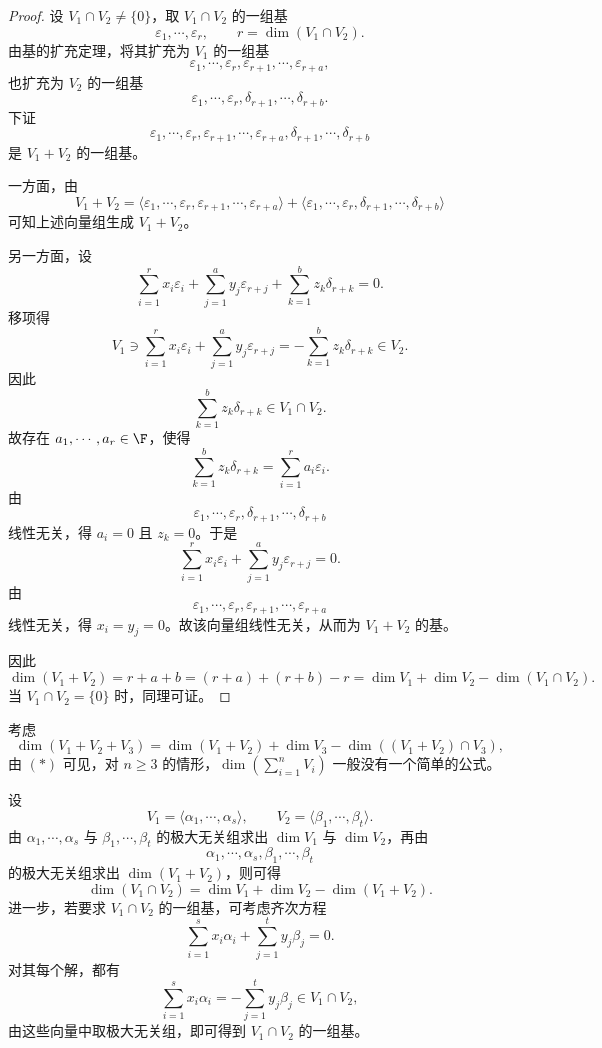 \begin{proof}
	设 $V_1\cap V_2\neq\{0\}$，取 $V_1\cap V_2$ 的一组基
	\[
	\varepsilon_1,\cdots,\varepsilon_r,
	\qquad
	r=\dim(V_1\cap V_2).
	\]
	由基的扩充定理，将其扩充为 $V_1$ 的一组基
	\[
	\varepsilon_1,\cdots,\varepsilon_r,
	\varepsilon_{r+1},\cdots,\varepsilon_{r+a},
	\]
	也扩充为 $V_2$ 的一组基
	\[
	\varepsilon_1,\cdots,\varepsilon_r,
	\delta_{r+1},\cdots,\delta_{r+b}.
	\]
	下证
	\[
	\varepsilon_1,\cdots,\varepsilon_r,
	\varepsilon_{r+1},\cdots,\varepsilon_{r+a},
	\delta_{r+1},\cdots,\delta_{r+b}
	\]
	是 $V_1+V_2$ 的一组基。
	
	一方面，由
	\[
	V_1+V_2
	=
	\langle \varepsilon_1,\cdots,\varepsilon_r,
	\varepsilon_{r+1},\cdots,\varepsilon_{r+a}\rangle
	+
	\langle \varepsilon_1,\cdots,\varepsilon_r,
	\delta_{r+1},\cdots,\delta_{r+b}\rangle
	\]
	可知上述向量组生成 $V_1+V_2$。
	
	另一方面，设
	\[
	\sum_{i=1}^{r}x_i\varepsilon_i
	+
	\sum_{j=1}^{a}y_j\varepsilon_{r+j}
	+
	\sum_{k=1}^{b}z_k\delta_{r+k}
	=0.
	\]
	移项得
	\[
	V_1\ni
	\sum_{i=1}^{r}x_i\varepsilon_i
	+
	\sum_{j=1}^{a}y_j\varepsilon_{r+j}
	=
	-\sum_{k=1}^{b}z_k\delta_{r+k}
	\in V_2.
	\]
	因此
	\[
	\sum_{k=1}^{b}z_k\delta_{r+k}\in V_1\cap V_2.
	\]
	故存在 $a_1,\cdots,a_r\in\F$，使得
	\[
	\sum_{k=1}^{b}z_k\delta_{r+k}
	=
	\sum_{i=1}^{r}a_i\varepsilon_i.
	\]
	由
	\[
	\varepsilon_1,\cdots,\varepsilon_r,
	\delta_{r+1},\cdots,\delta_{r+b}
	\]
	线性无关，得 $a_i=0$ 且 $z_k=0$。于是
	\[
	\sum_{i=1}^{r}x_i\varepsilon_i
	+
	\sum_{j=1}^{a}y_j\varepsilon_{r+j}=0.
	\]
	由
	\[
	\varepsilon_1,\cdots,\varepsilon_r,
	\varepsilon_{r+1},\cdots,\varepsilon_{r+a}
	\]
	线性无关，得 $x_i=y_j=0$。故该向量组线性无关，从而为 $V_1+V_2$ 的基。
	
	因此
	\[
	\dim(V_1+V_2)=r+a+b
	=(r+a)+(r+b)-r
	=\dim V_1+\dim V_2-\dim(V_1\cap V_2).
	\]
	当 $V_1\cap V_2=\{0\}$ 时，同理可证。
\end{proof}

考虑
\[
\dim(V_1+V_2+V_3)
=
\dim(V_1+V_2)+\dim V_3-
\dim((V_1+V_2)\cap V_3),
\]
由 $(*)$ 可见，对 $n\geq 3$ 的情形，$\dim(\sum_{i=1}^{n}V_i)$ 一般没有一个简单的公式。

\begin{example}
	设
	\[
	V_1=\langle \alpha_1,\cdots,\alpha_s\rangle,
	\qquad
	V_2=\langle \beta_1,\cdots,\beta_t\rangle.
	\]
	由 $\alpha_1,\cdots,\alpha_s$ 与 $\beta_1,\cdots,\beta_t$ 的极大无关组求出 $\dim V_1$ 与 $\dim V_2$，再由
	\[
	\alpha_1,\cdots,\alpha_s,
	\beta_1,\cdots,\beta_t
	\]
	的极大无关组求出 $\dim(V_1+V_2)$，则可得
	\[
	\dim(V_1\cap V_2)
	=
	\dim V_1+\dim V_2-\dim(V_1+V_2).
	\]
	进一步，若要求 $V_1\cap V_2$ 的一组基，可考虑齐次方程
	\[
	\sum_{i=1}^{s}x_i\alpha_i
	+
	\sum_{j=1}^{t}y_j\beta_j=0.
	\]
	对其每个解，都有
	\[
	\sum_{i=1}^{s}x_i\alpha_i
	=
	-\sum_{j=1}^{t}y_j\beta_j\in V_1\cap V_2,
	\]
	由这些向量中取极大无关组，即可得到 $V_1\cap V_2$ 的一组基。
\end{example}

